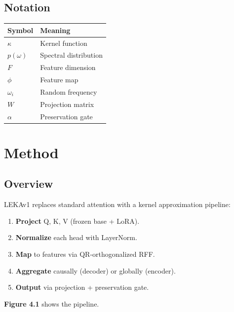 \subsection{Notation}

\begin{table}[H]
\centering
\small
\begin{tabular}{ll}
\toprule
\textbf{Symbol} & \textbf{Meaning} \\
\midrule
$\kappa$ & Kernel function \\
$p(\omega)$ & Spectral distribution \\
$F$ & Feature dimension \\
$\phi$ & Feature map \\
$\omega_i$ & Random frequency \\
$W$ & Projection matrix \\
$\alpha$ & Preservation gate \\
\bottomrule
\end{tabular}
\end{table}



\section{Method}

\subsection{Overview}

LEKAv1 replaces standard attention with a kernel approximation pipeline:

\begin{enumerate}
\item \textbf{Project} Q, K, V (frozen base + LoRA).
\item \textbf{Normalize} each head with LayerNorm.
\item \textbf{Map} to features via QR-orthogonalized RFF.
\item \textbf{Aggregate} causally (decoder) or globally (encoder).
\item \textbf{Output} via projection + preservation gate.

\end{enumerate}
\textbf{Figure 4.1} shows the pipeline.

